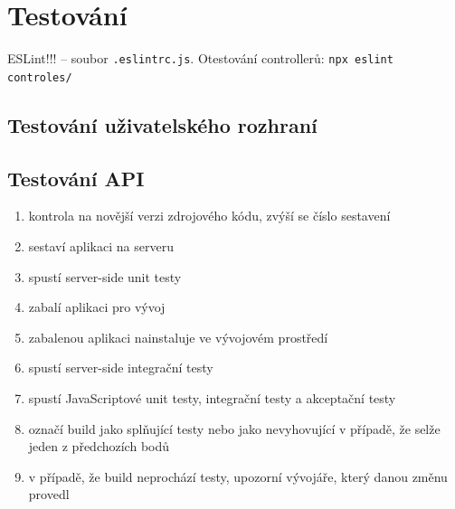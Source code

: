 \chapter{Testování}
ESLint!!! -- soubor \texttt{.eslintrc.js}.
Otestování controllerů: \texttt{npx eslint controles/}

\section{Testování uživatelského rozhraní}
\section{Testování API}


\begin{enumerate}
\item kontrola na novější verzi zdrojového kódu, zvýší se číslo sestavení
\item sestaví aplikaci na serveru
\item spustí server-side unit testy
\item zabalí aplikaci pro vývoj
\item zabalenou aplikaci nainstaluje ve vývojovém prostředí
\item spustí server-side integrační testy
\item spustí JavaScriptové unit testy, integrační testy a akceptační testy
\item označí build jako splňující testy nebo jako nevyhovující v případě, že selže jeden z předchozích bodů
\item v případě, že build neprochází testy, upozorní vývojáře, který danou změnu provedl
\end{enumerate}

